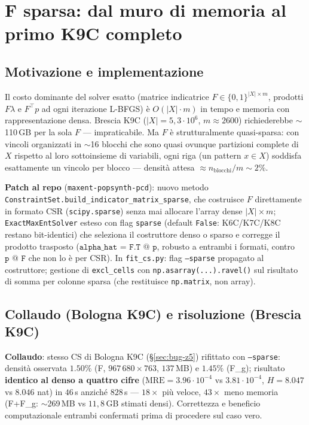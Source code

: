 \documentclass[11pt,a4paper]{article}
\newcommand{\code}[1]{\texttt{#1}}
\begin{document}
\section{F sparsa: dal muro di memoria al primo K9C completo}
\label{sec:sparse}

\subsection{Motivazione e implementazione}
Il costo dominante del solver esatto (matrice indicatrice
$F\in\{0,1\}^{|X|\times m}$, prodotti $F\lambda$ e $F^\top p$ ad ogni
iterazione L-BFGS) \`e $O(|X|\cdot m)$ in tempo e memoria con
rappresentazione densa. Brescia K9C ($|X|=5{,}3\cdot10^6$,
$m\approx2600$) richiederebbe $\sim$110\,GB per la sola $F$ ---
impraticabile. Ma $F$ \`e strutturalmente quasi-sparsa: con
vincoli organizzati in $\sim$16 blocchi che sono quasi ovunque
partizioni complete di $X$ rispetto al loro sottoinsieme di variabili,
ogni riga (un pattern $x\in X$) soddisfa esattamente un vincolo per
blocco --- densit\`a attesa $\approx n_{\text{blocchi}}/m\sim2\%$.

\medskip\noindent\textbf{Patch al repo} (\code{maxent-popsynth-pcd}):
nuovo metodo \code{ConstraintSet.build\_indicator\_matrix\_sparse}, che
costruisce $F$ direttamente in formato CSR (\code{scipy.sparse}) senza
mai allocare l'array dense $|X|\times m$; \code{ExactMaxEntSolver} esteso
con flag \code{sparse} (default \code{False}: K6C/K7C/K8C restano
bit-identici) che seleziona il costruttore denso o sparso e corregge il
prodotto trasposto ($\code{alpha\_hat = F.T @ p}$, robusto a entrambi i
formati, contro $\code{p @ F}$ che non lo \`e per CSR). In
\code{fit\_cs.py}: flag \code{--sparse} propagato al costruttore;
gestione di \code{excl\_cells} con \code{np.asarray(...).ravel()} sul
risultato di somma per colonne sparsa (che restituisce
\code{np.matrix}, non array).

\subsection{Collaudo (Bologna K9C) e risoluzione (Brescia K9C)}
\textbf{Collaudo}: stesso CS di Bologna K9C (\S\ref{sec:bug-z5}) rifittato
con \code{--sparse}: densit\`a osservata $1.50\%$ (F, $967\,680\times763$,
$137$\,MB) e $1.45\%$ (F\_g); risultato \textbf{identico al denso a
quattro cifre} ($\text{MRE}=3.96\cdot10^{-4}$ vs $3.81\cdot10^{-4}$,
$H=8.047$ vs $8.046$ nat) in $46$\,s anzich\'e $828$\,s ---
$18\times$ pi\`u veloce, $43\times$ meno memoria (F+F\_g: $\sim$269\,MB
vs $11{,}8$\,GB stimati densi). Correttezza e beneficio computazionale
entrambi confermati prima di procedere sul caso vero.
\end{document}
